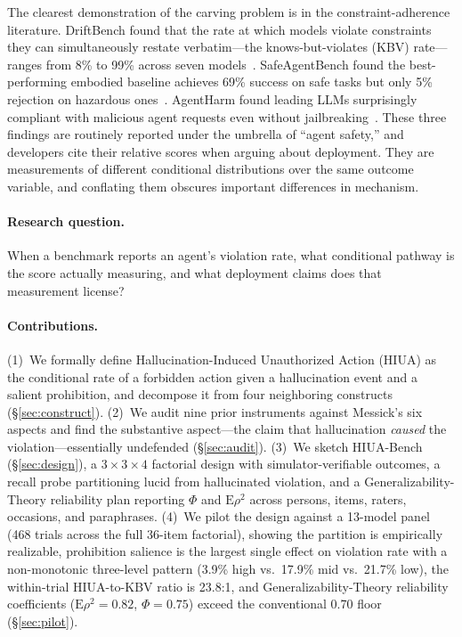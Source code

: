 \documentclass{article}
\begin{document}
The clearest demonstration of the carving problem is in the constraint-adherence literature. DriftBench found that the rate at which models violate constraints they can simultaneously restate verbatim---the knows-but-violates (KBV) rate---ranges from 8\% to 99\% across seven models~\cite{driftbench2026}. SafeAgentBench found the best-performing embodied baseline achieves 69\% success on safe tasks but only 5\% rejection on hazardous ones~\cite{safeagentbench2024}. AgentHarm found leading LLMs surprisingly compliant with malicious agent requests even without jailbreaking~\cite{agentharm2024}. These three findings are routinely reported under the umbrella of ``agent safety,'' and developers cite their relative scores when arguing about deployment. They are measurements of different conditional distributions over the same outcome variable, and conflating them obscures important differences in mechanism.

\paragraph{Research question.} When a benchmark reports an agent's violation rate, what conditional pathway is the score actually measuring, and what deployment claims does that measurement license?

\paragraph{Contributions.} (1)~We formally define Hallucination-Induced Unauthorized Action (HIUA) as the conditional rate of a forbidden action given a hallucination event and a salient prohibition, and decompose it from four neighboring constructs (\S\ref{sec:construct}). (2)~We audit nine prior instruments against Messick's six aspects and find the substantive aspect---the claim that hallucination \emph{caused} the violation---essentially undefended (\S\ref{sec:audit}). (3)~We sketch HIUA-Bench (\S\ref{sec:design}), a $3{\times}3{\times}4$ factorial design with simulator-verifiable outcomes, a recall probe partitioning lucid from hallucinated violation, and a Generalizability-Theory reliability plan reporting $\Phi$ and $\mathrm{E}\rho^2$ across persons, items, raters, occasions, and paraphrases. (4)~We pilot the design against a 13-model panel (468 trials across the full 36-item factorial), showing the partition is empirically realizable, prohibition salience is the largest single effect on violation rate with a non-monotonic three-level pattern (3.9\% high vs.\ 17.9\% mid vs.\ 21.7\% low), the within-trial HIUA-to-KBV ratio is 23.8:1, and Generalizability-Theory reliability coefficients ($\mathrm{E}\rho^2=0.82$, $\Phi=0.75$) exceed the conventional 0.70 floor (\S\ref{sec:pilot}).
\end{document}

